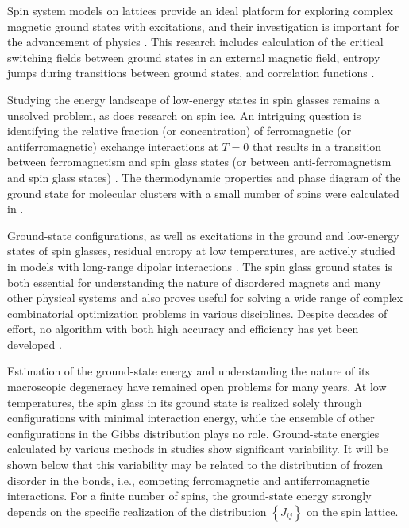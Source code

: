 \documentclass[preprint,12pt]{elsarticle}
\begin{document}
	Spin system models on lattices provide an ideal platform for exploring complex magnetic ground states with excitations, and their investigation is important for the advancement of physics \cite{lacroix2011introduction}. This research includes calculation of the critical switching fields between ground states in an external magnetic field, entropy jumps during transitions between ground states, and correlation functions \cite{ramirez2004effect, rosas2004random, andriushchenko2019large}.  
	
	Studying the energy landscape of low-energy states in spin glasses \cite{biswas2023energy} remains a unsolved problem, as does research on spin ice. An intriguing question is identifying the relative fraction (or concentration) of ferromagnetic (or antiferromagnetic) exchange interactions at $T=0$ that results in a transition between ferromagnetism and spin glass states (or between anti-ferromagnetism and spin glass states) \cite{gruzberg2001random, honecker2001universality, picco2006strong, tsomokos2011interplay, zimmer2022role}. The thermodynamic properties and phase diagram of the ground state for molecular clusters with a small number of spins were calculated in \cite{dias2023ground}.
	
	Ground-state configurations, as well as excitations in the ground and low-energy states of spin glasses, residual entropy at low temperatures, are actively studied in models with long-range dipolar interactions \cite{makarova2021low, singh2024micromagnetic}. The spin glass ground states is both essential for understanding the nature of disordered magnets and many other physical systems and also proves useful for solving a wide range of complex combinatorial optimization problems in various disciplines. Despite decades of effort, no algorithm with both high accuracy and efficiency has yet been developed \cite{fan2023searching}.  
	
	Estimation of the ground-state energy and understanding the nature of its macroscopic degeneracy have remained open problems for many years. At low temperatures, the spin glass in its ground state is realized solely through configurations with minimal interaction energy, while the ensemble of other configurations in the Gibbs distribution plays no role. Ground-state energies calculated by various methods in studies \cite{thouless1977solution, sherrington1975solvable, tanaka1980analytic, klein1976comparison, kirkpatrick1978infinite, karandashev2019global, palmer1999ground, campbell2004energy, roma2009ground} show significant variability. It will be shown below that this variability may be related to the distribution of frozen disorder in the bonds, i.e., competing ferromagnetic and antiferromagnetic interactions. For a finite number of spins, the ground-state energy strongly depends on the specific realization of the distribution $\left\lbrace J_{ij} \right\rbrace$ on the spin lattice.  
	
\end{document}
